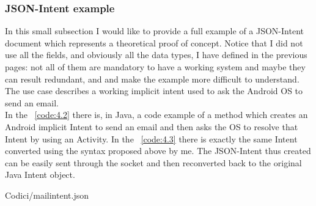 \subsubsection{JSON-Intent example}
In this small subsection I would like to provide a full example of a JSON-Intent document which represents a theoretical proof of concept. Notice that I did not use all the fields, and obviously all the data types, I have defined in the previous pages: not all of them are
mandatory to have a working system and maybe they can result redundant, and and make the example more difficult to understand.\\
The use case describes a working implicit intent used to ask the Android OS to send an email.\\
In the \lstlistingname~\ref{code:4.2} there is, in Java, a code example of a method which creates an Android implicit Intent to send an email and then asks the OS to resolve that Intent by using an Activity. In the \lstlistingname~\ref{code:4.3} there is exactly the same Intent converted using the syntax proposed above by me. The JSON-Intent thus created can be easily sent through the socket and then reconverted back to the original Java Intent object.

\begin{lstinputlisting}[
	language=JSON,
	caption={Conversion of the Intent in Listing \ref{code:4.2} to JSON-Intent},
	label=code:4.3]
	{Codici/mailintent.json}
\end{lstinputlisting}
